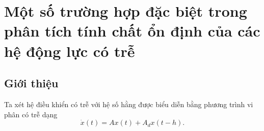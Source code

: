 \chapter{Một số trường hợp đặc biệt trong phân tích tính chất ổn định của các hệ động lực có trễ}
\setlength{\parindent}{6.5ex}

\section{Giới thiệu}
Ta xét hệ điều khiển có trễ với hệ số hằng được biểu diễn bằng phương trình vi phân có trễ dạng
\begin{equation}\label{eq1}
	\dot{x}(t)=Ax(t) + A_dx(t -h). 
\end{equation}
